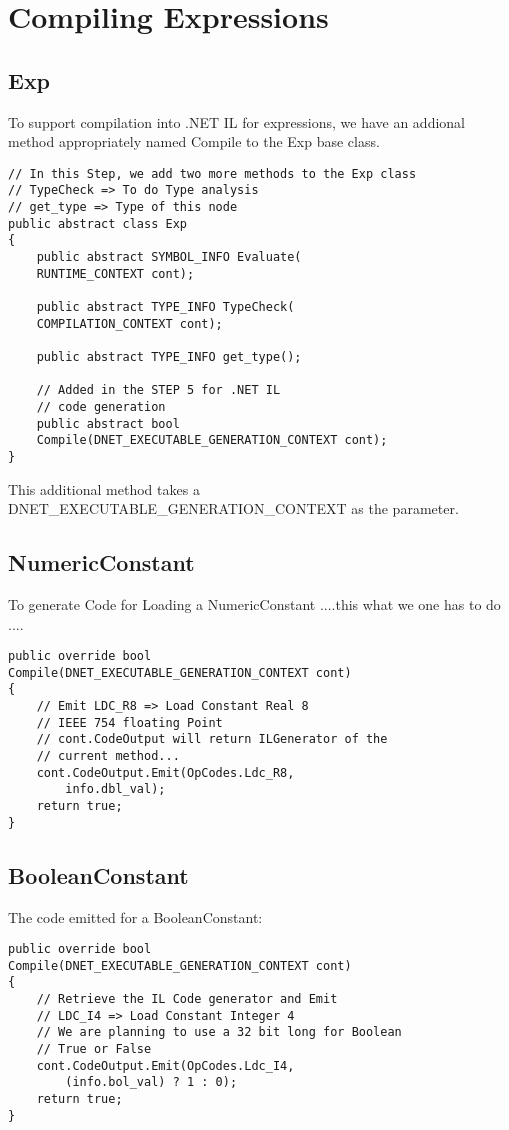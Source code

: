 \section{Compiling Expressions}
\subsection{Exp}
To support compilation into .NET IL for expressions, we have an addional method appropriately named Compile to the Exp base class.

\lstset{style=csharp}
\begin{lstlisting}
// In this Step, we add two more methods to the Exp class
// TypeCheck => To do Type analysis
// get_type => Type of this node
public abstract class Exp
{
	public abstract SYMBOL_INFO Evaluate(
	RUNTIME_CONTEXT cont);
	
	public abstract TYPE_INFO TypeCheck(
	COMPILATION_CONTEXT cont);
	
	public abstract TYPE_INFO get_type();
	
	// Added in the STEP 5 for .NET IL 
	// code generation
	public abstract bool 
	Compile(DNET_EXECUTABLE_GENERATION_CONTEXT cont);
}
\end{lstlisting}
This additional method takes a \\
DNET\_EXECUTABLE\_GENERATION\_CONTEXT as the parameter.
\subsection{NumericConstant}
To generate Code for Loading a NumericConstant ....this what we one has to do ....
\lstset{style=csharp}
\begin{lstlisting}
public override bool 
Compile(DNET_EXECUTABLE_GENERATION_CONTEXT cont)
{
	// Emit LDC_R8 => Load Constant Real 8
	// IEEE 754 floating Point
	// cont.CodeOutput will return ILGenerator of the
	// current method...
	cont.CodeOutput.Emit(OpCodes.Ldc_R8, 
		info.dbl_val);
	return true;
}
\end{lstlisting}
\subsection{BooleanConstant}
The code emitted for a BooleanConstant:

\lstset{style=csharp}
\begin{lstlisting}
public override bool 
Compile(DNET_EXECUTABLE_GENERATION_CONTEXT cont)
{
	// Retrieve the IL Code generator and Emit
	// LDC_I4 => Load Constant Integer 4
	// We are planning to use a 32 bit long for Boolean
	// True or False
	cont.CodeOutput.Emit(OpCodes.Ldc_I4, 
		(info.bol_val) ? 1 : 0);
	return true;
}
\end{lstlisting}

